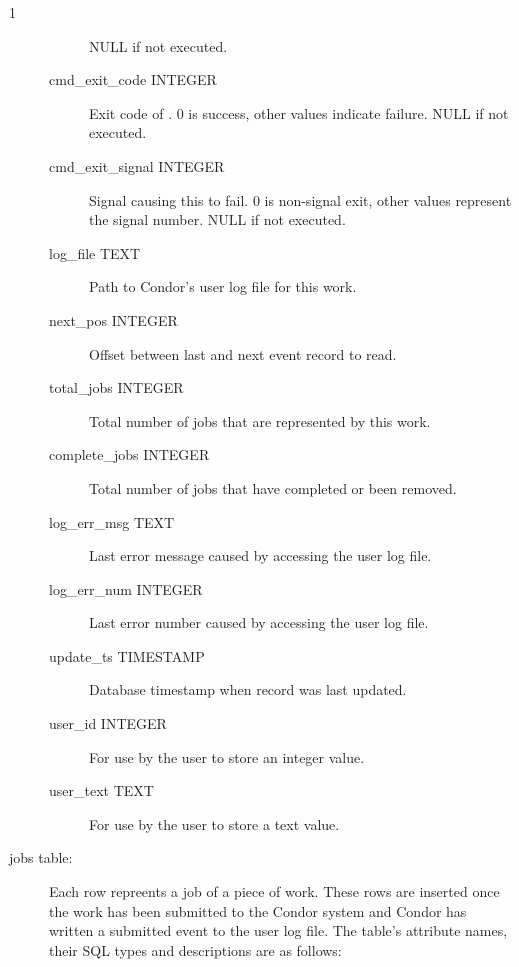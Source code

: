 \begin{ManPage}{\label{man-condor-dbq.pl}}{1}
\begin{description}
\begin{description}
	NULL if  not executed.
    \item[cmd\_exit\_code INTEGER]
	Exit code of .
	0 is success, other values indicate failure.
	NULL if  not executed.
    \item[cmd\_exit\_signal INTEGER]
	Signal causing this  to fail.
	0 is non-signal exit, other values represent the signal number.
	NULL if  not executed.
    \item[log\_file TEXT]
	Path to Condor's user log file for this work.
    \item[next\_pos INTEGER]
	Offset between last and next event record to read.
    \item[total\_jobs INTEGER]
	Total number of jobs that are represented by this work.
    \item[complete\_jobs INTEGER]
	Total number of jobs that have completed or been removed.
    \item[log\_err\_msg TEXT]
	Last error message caused by accessing the user log file.
    \item[log\_err\_num INTEGER]
	Last error number caused by accessing the user log file.
    \item[update\_ts TIMESTAMP]
	Database timestamp when record was last updated.
    \item[user\_id INTEGER]
	For use by the user to store an integer value.
    \item[user\_text TEXT]
	For use by the user to store a text value.
  \end{description}

\item[jobs table:]
  Each row repreents a job of a piece of work.
  These rows are inserted once the work has been submitted to the Condor system 
  and Condor has written a submitted event to the user log file.
  The table's attribute names, their SQL types and descriptions are as follows:


\end{description}
\end{ManPage}
